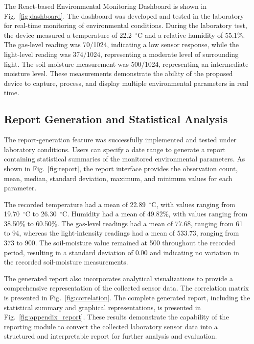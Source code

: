 ﻿\documentclass[journal]{IEEEtran}
\begin{document}
The React-based Environmental Monitoring Dashboard is shown in
Fig.~\ref{fig:dashboard}. The dashboard was developed and tested in the
laboratory for real-time monitoring of environmental conditions. During the
laboratory test, the device measured a temperature of 22.2~$^\circ$C and a
relative humidity of 55.1\%. The gas-level reading was 70/1024, indicating
a low sensor response, while the light-level reading was 374/1024,
representing a moderate level of surrounding light. The soil-moisture
measurement was 500/1024, representing an intermediate moisture level.
These measurements demonstrate the ability of the proposed device to
capture, process, and display multiple environmental parameters in
real time.

\subsection{Report Generation and Statistical Analysis}

The report-generation feature was successfully implemented and tested under
laboratory conditions. Users can specify a date range to generate a report
containing statistical summaries of the monitored environmental parameters.
As shown in Fig.~\ref{fig:report}, the report interface provides the
observation count, mean, median, standard deviation, maximum, and minimum
values for each parameter.

The recorded temperature had a mean of 22.89~$^\circ$C, with values ranging
from 19.70~$^\circ$C to 26.30~$^\circ$C. Humidity had a mean of 49.82\%,
with values ranging from 38.50\% to 60.50\%. The gas-level readings had a
mean of 77.68, ranging from 61 to 94, whereas the light-intensity readings
had a mean of 533.73, ranging from 373 to 900. The soil-moisture value
remained at 500 throughout the recorded period, resulting in a standard
deviation of 0.00 and indicating no variation in the recorded soil-moisture
measurements.

The generated report also incorporates analytical visualizations to provide
a comprehensive representation of the collected sensor data. The
correlation matrix is presented in Fig.~\ref{fig:correlation}. The complete
generated report, including the statistical summary and graphical
representations, is presented in Fig.~\ref{fig:appendix_report}.
These results demonstrate the capability of the reporting module to convert
the collected laboratory sensor data into a structured and interpretable
report for further analysis and evaluation.
\end{document}
